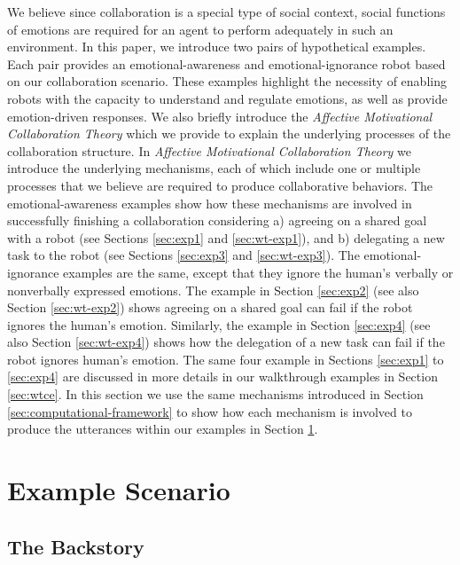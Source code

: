 We believe since collaboration is a special type of social context, social
functions of emotions are required for an agent to perform adequately in such an
environment. In this paper, we introduce two pairs of hypothetical examples.
Each pair provides an emotional-awareness and emotional-ignorance robot based on
our collaboration scenario. These examples highlight the necessity of enabling
robots with the capacity to understand and regulate emotions, as well as
provide emotion-driven responses. We also briefly introduce the
\textit{Affective Motivational Collaboration Theory} which we provide to
explain the underlying processes of the collaboration structure. In
\textit{Affective Motivational Collaboration Theory} we introduce the underlying
mechanisms, each of which include one or multiple processes that we believe are
required to produce collaborative behaviors. The emotional-awareness examples
show how these mechanisms are involved in successfully finishing a collaboration
considering a) agreeing on a shared goal with a robot (see Sections
\ref{sec:exp1} and \ref{sec:wt-exp1}), and b) delegating a new task to the robot
(see Sections \ref{sec:exp3} and \ref{sec:wt-exp3}). The emotional-ignorance
examples are the same, except that they ignore the human's verbally or
nonverbally expressed emotions. The example in Section \ref{sec:exp2} (see also
Section \ref{sec:wt-exp2}) shows agreeing on a shared goal can fail if the robot
ignores the human's emotion. Similarly, the example in Section \ref{sec:exp4}
(see also Section \ref{sec:wt-exp4}) shows how the delegation of a new task can
fail if the robot ignores human's emotion. The same four example in Sections
\ref{sec:exp1} to \ref{sec:exp4} are discussed in more details in our
walkthrough examples in Section \ref{sec:wtce}. In this section we use the same
mechanisms introduced in Section \ref{sec:computational-framework} to show how
each mechanism is involved to produce the utterances within our examples in
Section \ref{sec:example-scenario}.

\section{Example Scenario}
\label{sec:example-scenario}

\subsection{The Backstory}

